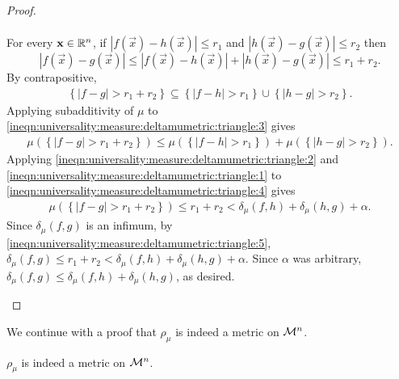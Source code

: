\begin{proof}
\begin{step}
\begin{align}
\end{align}
For every $\mathbf{x} \in {\mathbb R}^n$, if $| f(\vec{x}) - h(\vec{x}) | \leq r_1$ and $| h(\vec{x}) - g(\vec{x}) | \leq r_2$ then \[ 
    | f(\vec{x}) - g(\vec{x}) | \leq  | f(\vec{x}) - h(\vec{x}) |  + | h(\vec{x}) - g(\vec{x}) | \leq r_1 + r_2.
\]
By contrapositive, \begin{align}
    \label{ineqn:universality:measure:deltamumetric:triangle:3}
    \left \{ | f - g | > r_1 + r_2 \right \} \subseteq \left \{ | f - h | > r_1 \right \} \cup \left \{ | h - g | > r_2 \right \}.
\end{align}
Applying subadditivity of $\mu$ to \ref{ineqn:universality:measure:deltamumetric:triangle:3} gives \begin{align}
\label{ineqn:universality:measure:deltamumetric:triangle:4}
    \mu (\left \{ | f - g | > r_1 + r_2 \right \}) \leq \mu (\left \{ | f - h | > r_1 \right \}) + \mu (\left \{ | h - g | > r_2 \right \}).
\end{align}
Applying \ref{ineqn:universality:measure:deltamumetric:triangle:2} and \ref{ineqn:universality:measure:deltamumetric:triangle:1} to \ref{ineqn:universality:measure:deltamumetric:triangle:4} gives \begin{align}
\label{ineqn:universality:measure:deltamumetric:triangle:5}
    \mu (\left \{ | f - g | > r_1 + r_2 \right \}) \leq r_1 + r_2 < \delta_\mu(f, h) + \delta_\mu(h, g) + \alpha.
\end{align}
Since $\delta_\mu(f,g)$ is an infimum, by \ref{ineqn:universality:measure:deltamumetric:triangle:5}, $\delta_\mu(f,g) \leq r_1 + r_2 < \delta_\mu(f, h) + \delta_\mu(h, g) + \alpha$. Since $\alpha$ was arbitrary, $\delta_\mu(f,g) \leq \delta_\mu(f, h) + \delta_\mu(h, g)$, as desired.
\end{step}
\end{proof}
We continue with a proof that $\rho_\mu$ is indeed a metric on ${\mathcal M}^n$.
\begin{proposition}
\label{proposition:universality:measure:rhomumetric}
$\rho_\mu$ is indeed a metric on ${\mathcal M}^n$.
\end{proposition}
